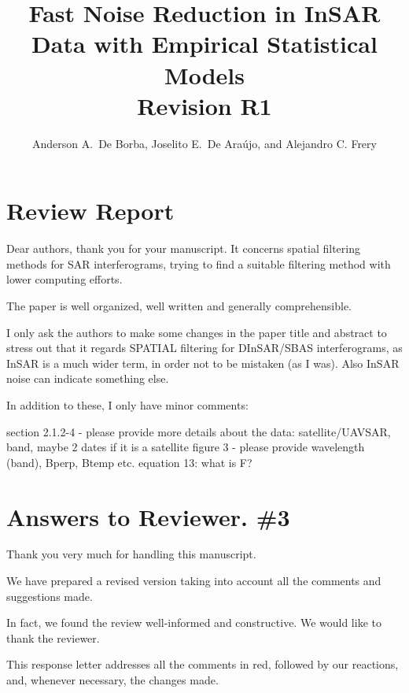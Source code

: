 \documentclass[a4paper,10pt]{article}
\begin{document}
\title{Fast Noise Reduction in InSAR Data with Empirical Statistical Models\\
	Revision R1}


\author{Anderson A.\ De Borba,
	Joselito E.\ De Araújo, and
	Alejandro C. Frery}


\maketitle


\section{Review Report}
\begin{tcolorbox}[colback=red!5!white,colframe=red!75!black,title=Review Report]
Dear authors, thank you for your manuscript. It concerns spatial filtering methods for SAR interferograms, trying to find a suitable filtering method with lower computing efforts.

The paper is well organized, well written and generally comprehensible.

I only ask the authors to make some changes in the paper title and abstract to stress out that it regards SPATIAL filtering for DInSAR/SBAS interferograms, as InSAR is a much wider term, in order not to be mistaken (as I was). Also InSAR noise can indicate something else.

In addition to these, I only have minor comments:

section 2.1.2-4 - please provide more details about the data: satellite/UAVSAR, band, maybe 2 dates if it is a satellite
figure 3 - please provide wavelength (band), Bperp, Btemp etc.
equation 13: what is F?

\end{tcolorbox}



\section{Answers to Reviewer. \#3}

Thank you very much for handling this manuscript.

We have prepared a revised version taking into account all the comments and suggestions made.

In fact, we found the review well-informed and constructive. We would like to thank the reviewer.

This response letter addresses all the comments in red, followed by
our reactions, and, whenever necessary, the changes made.
\end{document}
